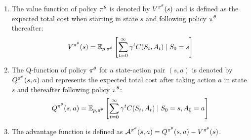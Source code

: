 \documentclass[12pt,twoside]{../../mitthesis}
\begin{document}
\begin{enumerate}
    \item The value function of policy $\policy^{\theta}$ is denoted by $V^{\policy^{\theta}}(s)$ and is defined as the expected total cost when starting in state $s$ and following policy $\policy^{\theta}$ thereafter:
    $$
    \Value^{\policy^{\theta}}(s) =  \E[\transit, \policy^{\theta}]{\sum_{t = 0}^{\infty} \gamma ^ t \Cost(\State_{t}, \Action_{t}) \mid \State_0 = \state}
    $$ 
    \item The Q-function of policy $\policy^{\theta}$ for a state-action pair $(s, a)$ is denoted by $Q^{\policy^{\theta}}(s, a)$ and represents the expected total cost after taking action $a$ in state $s$ and thereafter following policy $\policy^{\theta}$: 
    $$
    Q^{\policy^{\theta}}(s, a) = \E[\transit, \policy^{\theta}]{\sum_{t = 0}^{\infty} \gamma ^ t \Cost(\State_{t}, \Action_{t}) \mid \State_0 = \state, \Action_0 = \action}
    $$
    \item The advantage function is defined as $\Advan^{\policy^{\theta}}(s, a) = Q^{\policy^{\theta}}(s, a) - \Value^{\policy^{\theta}}(s)$.
\end{enumerate}
\end{document}
